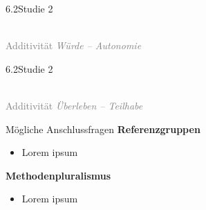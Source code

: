 \documentclass[xcolor=table,9pt,aspectratio=169]{beamer}
\begin{document}
\begin{frame}{\vspace*{10mm}6.2\hspace*{1em}Studie 2}
\begin{center}
   \\
   \textcolor{gray}{Additivität \textit{Würde -- Autonomie}}
\end{center}
\end{frame}


\begin{frame}{\vspace*{10mm}6.2\hspace*{1em}Studie 2}
\begin{center}
   \\
   \textcolor{gray}{Additivität \textit{Überleben -- Teilhabe}}
\end{center}
\end{frame}


\begin{frame}{\vspace*{10mm}Mögliche Anschlussfragen}
\textbf{Referenzgruppen}\\
\medskip
\begin{itemize}
   \item Lorem ipsum
\end{itemize}
\vspace{2em}
\textbf{Methodenpluralismus}\\
\medskip
\begin{itemize}
   \item Lorem ipsum
\end{itemize}
\end{frame}
\end{document}
